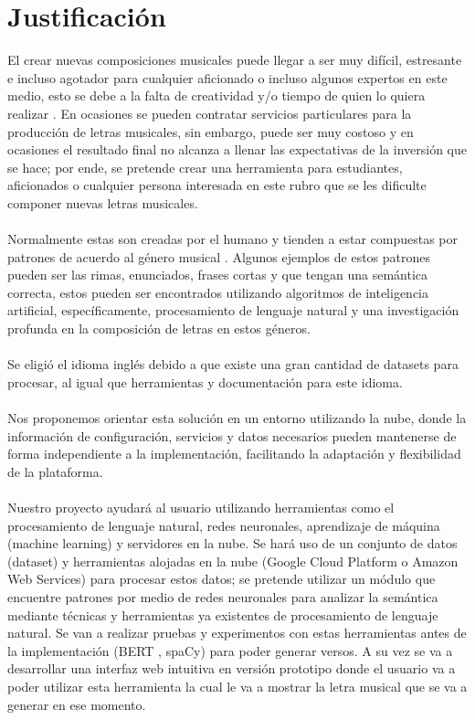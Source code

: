 \documentclass[12pt, a4paper, titlepage]{report}
\begin{document}
    	\section{Justificación}
    	El crear nuevas composiciones musicales puede llegar a ser muy difícil, estresante e incluso agotador para cualquier aficionado o incluso algunos expertos en este medio, esto se debe a la falta de creatividad y/o tiempo de quien lo quiera realizar \cite{What_about_the_music}. En ocasiones se pueden contratar servicios particulares para la producción de letras musicales, sin embargo, puede ser muy costoso y en ocasiones el resultado final no alcanza a llenar las expectativas de la inversión que se hace; por ende, se pretende crear una herramienta para estudiantes, aficionados o cualquier persona interesada en este rubro que se les dificulte componer nuevas letras musicales.\\\\
    	Normalmente estas son creadas por el humano y tienden a estar compuestas por patrones de acuerdo al género musical \cite{genero_musical_en_la_musica_popular}. Algunos ejemplos de estos patrones pueden ser las rimas, enunciados, frases cortas y que tengan una semántica correcta, estos pueden ser encontrados utilizando algoritmos de inteligencia artificial, específicamente, procesamiento de lenguaje natural y una investigación profunda en la composición de letras en estos géneros.\\\\
    	Se eligió el idioma inglés debido a que existe una gran cantidad de datasets para procesar, al igual que herramientas y documentación para este idioma.\\\\
    	Nos proponemos orientar esta solución en un entorno utilizando la nube, donde la información de configuración, servicios y datos necesarios pueden mantenerse de forma independiente a la implementación, facilitando la adaptación y flexibilidad de la plataforma.\\\\
    	Nuestro proyecto ayudará al usuario utilizando herramientas como el procesamiento de lenguaje natural, redes neuronales, aprendizaje de máquina (machine learning) y servidores en la nube. Se hará uso de un conjunto de datos (dataset) y herramientas alojadas en la nube (Google Cloud Platform o Amazon Web Services) para procesar estos datos; se pretende utilizar un módulo que encuentre patrones por medio de redes neuronales para analizar la semántica mediante técnicas y herramientas ya existentes de procesamiento de lenguaje natural. Se van a realizar pruebas y experimentos con estas herramientas antes de la implementación (BERT \cite{Bert}, spaCy\cite{spaCy}) para poder generar versos. A su vez se va a desarrollar una interfaz web intuitiva en versión prototipo donde el usuario va a poder utilizar esta herramienta la cual le va a mostrar la letra musical que se va a generar en ese momento.\\\\
\end{document}
